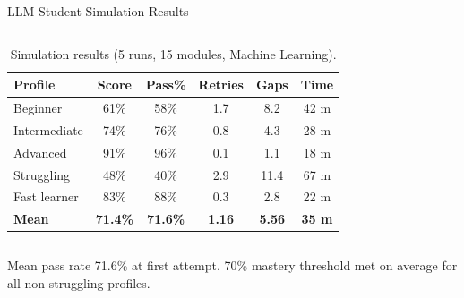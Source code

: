 \documentclass[aspectratio=169,9pt]{beamer}
\begin{document}
\begin{frame}{LLM Student Simulation Results}
\begin{columns}[T]
  \small
  \begin{table}
    \caption{Simulation results (5 runs, 15 modules, Machine Learning).}
    \begin{tabular}{@{}lccccc@{}}
      \toprule
      \textbf{Profile} & \textbf{Score} & \textbf{Pass\%} & \textbf{Retries} & \textbf{Gaps} & \textbf{Time} \\
      \midrule
      Beginner      & 61\% & 58\% & 1.7 & 8.2  & 42 m \\
      Intermediate  & 74\% & 76\% & 0.8 & 4.3  & 28 m \\
      Advanced      & 91\% & 96\% & 0.1 & 1.1  & 18 m \\
      Struggling    & 48\% & 40\% & 2.9 & 11.4 & 67 m \\
      Fast learner  & 83\% & 88\% & 0.3 & 2.8  & 22 m \\
      \midrule
      \textbf{Mean} & \textbf{71.4\%} & \textbf{71.6\%} & \textbf{1.16} & \textbf{5.56} & \textbf{35 m} \\
      \bottomrule
    \end{tabular}
  \end{table}

\end{columns}

\vspace{0.1cm}
\begin{resultbox}
  Mean pass rate 71.6\% at first attempt. 70\% mastery threshold met on average for all non-struggling profiles.
\end{resultbox}
\end{frame}
\end{document}

